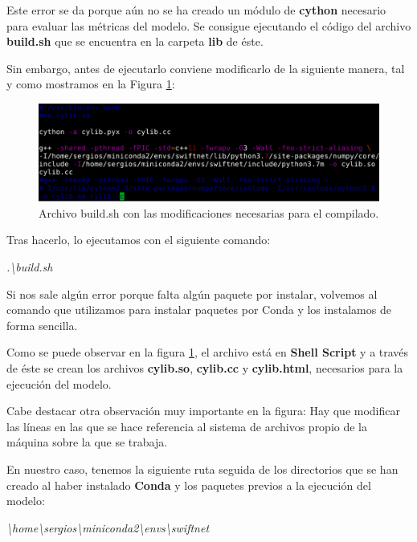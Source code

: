 Este error se da porque aún no se ha creado un módulo de \textbf{cython} \cite{cython} necesario para evaluar las métricas del modelo. Se consigue ejecutando el código del archivo \textbf{build.sh} que se encuentra en la carpeta \textbf{lib} de éste.

Sin embargo, antes de ejecutarlo conviene modificarlo de la siguiente manera, tal y como mostramos en la Figura \ref{fig:cylib}:

\begin{figure}[H]
  \centering
  \includegraphics[width=12cm]{Figuras/cylib.eps}
  \caption{Archivo build.sh con las modificaciones necesarias para el compilado.}
  \label{fig:cylib}
\end{figure}

Tras hacerlo, lo ejecutamos con el siguiente comando:

\begin{center}
\textit{.\textbackslash{build.sh}}
\end{center}

Si nos sale algún error porque falta algún paquete por instalar, volvemos al comando que utilizamos para instalar paquetes por Conda y los instalamos de forma sencilla.

Como se puede observar en la figura \ref{fig:cylib}, el archivo está en \textbf{Shell Script} \cite{shell} y a través de éste se crean los archivos \textbf{cylib.so}, \textbf{cylib.cc} y \textbf{cylib.html}, necesarios para la ejecución del modelo.

Cabe destacar otra observación muy importante en la figura: Hay que modificar las líneas en las que se hace referencia al sistema de archivos propio de la máquina sobre la que se trabaja.

En nuestro caso, tenemos la siguiente ruta seguida de los directorios que se han creado al haber instalado \textbf{Conda} y los paquetes previos a la ejecución del modelo:

\begin{center}
\textit{\textbackslash{home}\textbackslash{sergios}\textbackslash{miniconda2}\textbackslash{envs}\textbackslash{swiftnet}}
\end{center}

